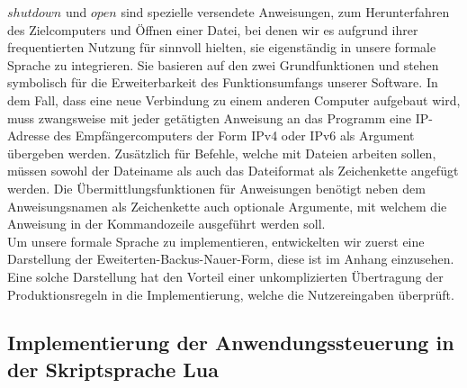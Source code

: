 $shutdown$ und $open$ sind spezielle versendete Anweisungen, zum Herunterfahren des Zielcomputers und Öffnen einer Datei, bei denen wir es aufgrund ihrer frequentierten Nutzung für sinnvoll hielten, sie eigenständig in unsere formale Sprache zu integrieren. Sie basieren auf den zwei Grundfunktionen und stehen symbolisch für die Erweiterbarkeit des Funktionsumfangs unserer Software. In dem Fall, dass eine neue Verbindung zu einem anderen Computer aufgebaut wird, muss zwangsweise mit jeder getätigten Anweisung an das Programm eine IP-Adresse des Empfängercomputers der Form IPv4 oder IPv6 als Argument übergeben werden. Zusätzlich für Befehle, welche mit Dateien arbeiten sollen, müssen sowohl der Dateiname als auch das Dateiformat als Zeichenkette angefügt werden. Die Übermittlungsfunktionen für Anweisungen benötigt neben dem Anweisungsnamen als Zeichenkette auch optionale Argumente, mit welchem die Anweisung in der Kommandozeile ausgeführt werden soll.\\
Um unsere formale Sprache zu implementieren, entwickelten wir zuerst eine Darstellung der Eweiterten-Backus-Nauer-Form, diese ist im Anhang einzusehen. Eine solche Darstellung hat den Vorteil einer unkomplizierten Übertragung der Produktionsregeln in die Implementierung, welche die Nutzereingaben überprüft.

\subsection{Implementierung der Anwendungssteuerung in der Skriptsprache Lua}

